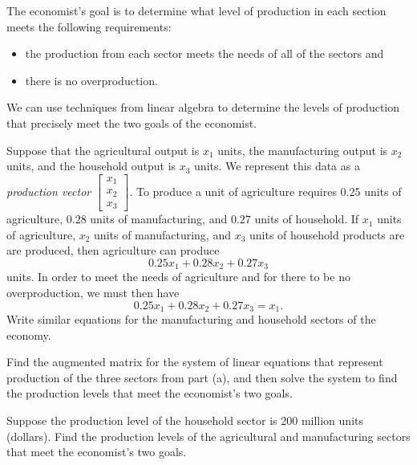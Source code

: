 The economist's goal is to determine what level of production in each section meets the following requirements:
\begin{itemize} \setlength{\itemsep}{-3pt}
\item the production from each sector meets the needs of all of the sectors and
\item there is no overproduction.
\end{itemize}

\begin{pactivity} \label{act:Closed_model} We can use techniques from linear algebra to determine the levels of production that precisely meet the two goals of the economist.
	\ba
	\item Suppose that the agricultural output is $x_1$ units, the manufacturing output is $x_2$ units, and the household output is $x_3$ units.  We represent this data as a \emph{production vector} $\left[ \begin{array}{c} x_1 \\ x_2 \\ x_3 \end{array} \right]$. To produce a unit of agriculture requires 0.25 units of agriculture, $0.28$ units of manufacturing, and $0.27$ units of household. If $x_1$ units of agriculture, $x_2$ units of manufacturing, and $x_3$ units of household products are are produced, then agriculture can produce  
\[0.25x_1 + 0.28x_2 + 0.27x_3\]
units. In order to meet the needs of agriculture and for there to be no overproduction, we must then have 
\[0.25x_1 + 0.28x_2 + 0.27x_3 = x_1.\] 
 Write similar equations for the manufacturing and household sectors of the economy.


\item  Find the augmented matrix for the system of linear equations that represent production of the three sectors from part (a), and then solve the system to find the production levels that meet the economist's two goals. 


\item Suppose the production level of the household sector is 200 million units (dollars). Find the production levels of the agricultural and manufacturing sectors that meet the economist's two goals.


\ea
\end{pactivity}

